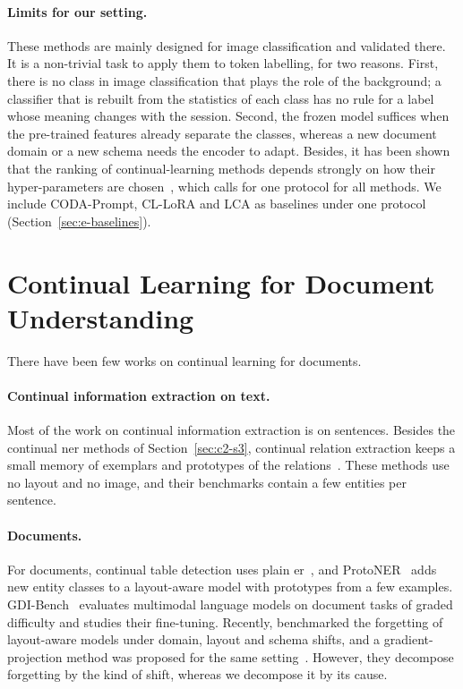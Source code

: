 \paragraph{Limits for our setting.} These methods are mainly designed for image
classification and validated there. It is a non-trivial task to apply them to token
labelling, for two reasons. First, there is no class in image classification that plays the
role of the background; a classifier that is rebuilt from the statistics of each class has
no rule for a label whose meaning changes with the session. Second, the frozen model
suffices when the pre-trained features already separate the classes, whereas a new document
domain or a new schema needs the encoder to adapt. Besides, it has been shown that the
ranking of continual-learning methods depends strongly on how their hyper-parameters are
chosen~\citep{cha2025hyperparameters}, which calls for one protocol for all methods. We
include CODA-Prompt, CL-LoRA and LCA as baselines under one protocol
(Section~\ref{sec:e-baselines}).

\section{Continual Learning for Document Understanding}
\label{sec:c2-s7}

There have been few works on continual learning for documents.

\paragraph{Continual information extraction on text.} Most of the work on continual
information extraction is on sentences. Besides the continual \gls{ner} methods of
Section~\ref{sec:c2-s3}, continual relation extraction keeps a small memory of exemplars
and prototypes of the relations~\citep{han2020emar,cui2021rpcre,zhao2022crl}. These methods
use no layout and no image, and their benchmarks contain a few entities per sentence.

\paragraph{Documents.} For documents, continual table detection uses plain
\gls{er}~\citep{minouei2022table}, and ProtoNER~\citep{kumar2023protoner} adds new entity
classes to a layout-aware model with prototypes from a few examples. GDI-Bench~\citep{gdibench}
evaluates multimodal language models on document tasks of graded difficulty and studies
their fine-tuning. Recently, \citet{sassioui2026documents} benchmarked the forgetting of
layout-aware models under domain, layout and schema shifts, and a gradient-projection
method was proposed for the same setting~\citep{sassioui2026amdproj}. However, they
decompose forgetting by the kind of shift, whereas we decompose it by its cause.

